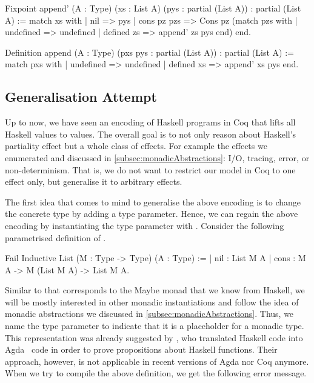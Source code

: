 \begin{coqcode}
Fixpoint append' (A : Type) (xs : List A) (pys : partial (List A))
  : partial (List A) :=
  match xs with
  | nil         => pys
  | cons pz pzs => Cons pz (match pzs with
                            | undefined  => undefined
                            | defined zs => append' zs pys
                            end)
  end.

Definition append (A : Type) (pxs pys : partial (List A))
  : partial (List A) :=
  match pxs with
  | undefined  => undefined
  | defined xs => append' xs pys
  end.
\end{coqcode}

\subsection{Generalisation Attempt}
\label{subsec:genericLifting}

Up to now, we have seen an encoding of Haskell programs in Coq that lifts all Haskell values to  values.
The overall goal is to not only reason about Haskell's partiality effect but a whole class of effects.
For example the effects we enumerated and discussed in \autoref{subsec:monadicAbstractions}: I/O, tracing, error, or non\--determinism.
That is, we do not want to restrict our model in Coq to one effect only, but generalise it to arbitrary effects.

The first idea that comes to mind to generalise the above encoding is to change the concrete type  by adding a type parameter.
Hence, we can regain the above encoding by instantiating the type parameter with .
Consider the following parametrised definition of .

\begin{coqcode}
Fail Inductive List (M : Type -> Type) (A : Type) :=
| nil : List M A
| cons : M A -> M (List M A) -> List M A.
\end{coqcode}

Similar to  that corresponds to the Maybe monad that we know from Haskell, we will be mostly interested in other monadic instantiations and follow the idea of monadic abstractions we discussed in \autoref{subsec:monadicAbstractions}.
Thus, we name the type parameter  to indicate that it is a placeholder for a monadic type.
This representation was already suggested by \citet{abel2005verifying}, who translated Haskell code into Agda~\citep{norell2009dependently} code in order to prove propositions about Haskell functions.
Their approach, however, is not applicable in recent versions of Agda nor Coq anymore.
When we try to compile the above definition, we get the following error message.


